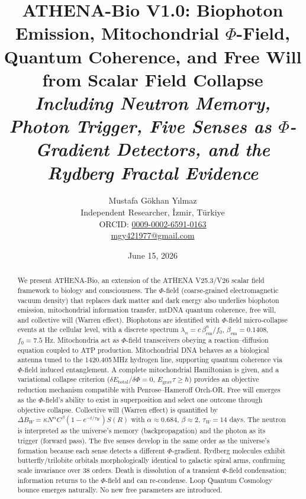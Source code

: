 \documentclass[11pt]{article}
\newcommand{\bem}{\beta_{\mathrm{em}}}
\begin{document}
\title{\textbf{ATHENA-Bio V1.0: Biophoton Emission, Mitochondrial $\Phi$-Field, Quantum Coherence, and Free Will from Scalar Field Collapse}\\
\large \textit{Including Neutron Memory, Photon Trigger, Five Senses as $\Phi$-Gradient Detectors, and the Rydberg Fractal Evidence}}
\author{Mustafa Gökhan Yılmaz\\[0.5em]
        Independent Researcher, \.Izmir, T\"urkiye\\
        ORCID: \href{https://orcid.org/0009-0002-6591-0163}{0009-0002-6591-0163}\\
        \href{mailto:mgy421977@gmail.com}{mgy421977@gmail.com}}
\date{June 15, 2026}
\maketitle

\begin{abstract}
We present ATHENA-Bio, an extension of the ATHENA V25.3/V26 scalar field framework to biology and consciousness. The $\Phi$-field (coarse‑grained electromagnetic vacuum density) that replaces dark matter and dark energy also underlies biophoton emission, mitochondrial information transfer, mtDNA quantum coherence, free will, and collective will (Warren effect). Biophotons are identified with $\Phi$-field micro‑collapse events at the cellular level, with a discrete spectrum $\lambda_n = c\,\bem^{n}/f_0$, $\bem=0.1408$, $f_0=7.5$ Hz. Mitochondria act as $\Phi$-field transceivers obeying a reaction–diffusion equation coupled to ATP production. Mitochondrial DNA behaves as a biological antenna tuned to the 1420.405 MHz hydrogen line, supporting quantum coherence via $\Phi$-field induced entanglement. A complete mitochondrial Hamiltonian is given, and a variational collapse criterion ($\delta E_{\mathrm{total}}/\delta\Phi=0$, $E_{\mathrm{grav}}\tau\ge\hbar$) provides an objective reduction mechanism compatible with Penrose–Hameroff Orch-OR. Free will emerges as the $\Phi$-field’s ability to exist in superposition and select one outcome through objective collapse. Collective will (Warren effect) is quantified by $\Delta B_W = \kappa N^{\alpha}C^{\beta}(1-e^{-t/\tau_W})S(R)$ with $\alpha\approx0.684$, $\beta\approx2$, $\tau_W=14$ days. The neutron is interpreted as the universe’s memory (backpropagation) and the photon as its trigger (forward pass). The five senses develop in the same order as the universe’s formation because each sense detects a different $\Phi$-gradient. Rydberg molecules exhibit butterfly/trilobite orbitals morphologically identical to galactic spiral arms, confirming scale invariance over 38 orders. Death is dissolution of a transient $\Phi$-field condensation; information returns to the $\Phi$-field and can re‑condense. Loop Quantum Cosmology bounce emerges naturally. No new free parameters are introduced.
\end{abstract}
\end{document}
